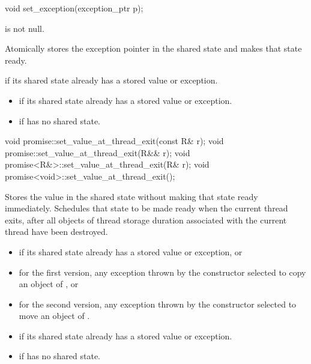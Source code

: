 %
\begin{itemdecl}
void set_exception(exception_ptr p);
\end{itemdecl}

\begin{itemdescr}
\pnum
\expects
{} is not null.

\pnum
\effects
Atomically stores the exception pointer  in the shared state
and makes that state ready.

\pnum
\throws
{} if its shared state
already has a stored value or exception.

\pnum
\errors

\begin{itemize}
\item {} if its shared state
already has a stored value or exception.
\item {} if  has no shared state.
\end{itemize}
\end{itemdescr}

%
\begin{itemdecl}
void promise::set_value_at_thread_exit(const R& r);
void promise::set_value_at_thread_exit(R&& r);
void promise<R&>::set_value_at_thread_exit(R& r);
void promise<void>::set_value_at_thread_exit();
\end{itemdecl}

\begin{itemdescr}
\pnum
\effects
Stores the value  in the shared state without making that
state ready immediately. Schedules that state to be made ready when the current
thread exits, after all objects of thread storage duration associated with the
current thread have been destroyed.

\pnum
\throws
\begin{itemize}
\item {} if its shared state
already has a stored value or exception, or
\item for the first version, any exception thrown by the constructor selected to copy an object of , or
\item for the second version, any exception thrown by the constructor selected to move an object of .
\end{itemize}

\pnum
\errors
\begin{itemize}
\item {} if its shared state
already has a stored value or exception.
\item {} if  has no shared state.
\end{itemize}
\end{itemdescr}

